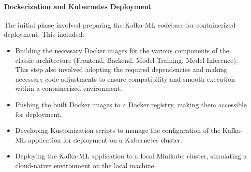 \paragraph{Dockerization and Kubernetes Deployment}
The initial phase involved preparing the Kafka-ML codebase for containerized deployment. This included:
\begin{itemize}
    \item Building the necessary Docker images for the various components of the classic architecture (Frontend, Backend, Model Training, Model Inference). This step also involved adopting the required dependencies and making necessary code adjustments to ensure compatibility and smooth execution within a containerized environment.
    \item Pushing the built Docker images to a Docker registry, making them accessible for deployment.
    \item Developing Kustomization scripts to manage the configuration of the Kafka-ML application for deployment on a Kubernetes cluster.
    \item Deploying the Kafka-ML application to a local Minikube cluster, simulating a cloud-native environment on the local machine.
\end{itemize}


